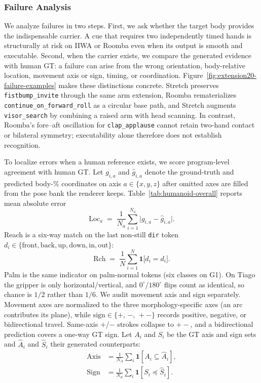 \documentclass[letterpaper,10pt,conference]{ieeeconf}
\begin{document}
\subsubsection{Failure Analysis}
We analyze failures in two steps. First, we ask whether the target body provides the indispensable carrier. A cue that requires two independently timed hands is structurally at risk on IIWA or Roomba even when its output is smooth and executable. Second, when the carrier exists, we compare the generated evidence with human GT: a failure can arise from the wrong orientation, body-relative location, movement axis or sign, timing, or coordination. Figure~\ref{fig:extension20-failure-examples} makes these distinctions concrete. Stretch preserves \texttt{fistbump\_invite} through the same arm extension, Roomba rematerializes \texttt{continue\_on\_forward\_roll} as a circular base path, and Stretch augments \texttt{visor\_search} by combining a raised arm with head scanning. In contrast, Roomba's fore--aft oscillation for \texttt{clap\_applause} cannot retain two-hand contact or bilateral symmetry; executability alone therefore does not establish recognition.

To localize errors when a human reference exists, we score program-level agreement with human GT.
Let $g_{i,a}$ and $\hat{g}_{i,a}$ denote the ground-truth and predicted body-\% coordinates on axis $a\in\{x,y,z\}$ after omitted axes are filled from the pose bank the renderer keeps.
Table~\ref{tab:humanoid-overall} reports mean absolute error
\begin{equation}
\mathrm{Loc}_a \;=\; \frac{1}{N_a}\sum_{i=1}^{N_a}\bigl|g_{i,a}-\hat{g}_{i,a}\bigr|.
\end{equation}
Reach is a six-way match on the last non-still \texttt{dir} token $d_i\in\{\mathrm{front},\mathrm{back},\mathrm{up},\mathrm{down},\mathrm{in},\mathrm{out}\}$:
\begin{equation}
\mathrm{Rch} \;=\; \frac{1}{N}\sum_{i=1}^{N}\mathbf{1}\bigl[\hat{d}_i=d_i\bigr].
\end{equation}
Palm is the same indicator on palm-normal tokens (six classes on G1).
On Tiago the gripper is only horizontal/vertical, and $0^\circ$/$180^\circ$ flips count as identical, so chance is $1/2$ rather than $1/6$.
We audit movement axis and sign separately. Movement axes are normalized to the three morphology-specific axes (an arc contributes its plane), while $\mathrm{sign}\in\{+,\,-,\,{+}{-}\}$ records positive, negative, or bidirectional travel. Same-axis $+$/$-$ strokes collapse to ${+}{-}$, and a bidirectional prediction covers a one-way GT sign. Let $A_i$ and $S_i$ be the GT axis and sign sets and $\hat{A}_i$ and $\hat{S}_i$ their generated counterparts:
\begin{equation}
\begin{aligned}
\mathrm{Axis} &= \frac{1}{N_A}\sum_i\mathbf{1}[A_i\subseteq\hat{A}_i],\\
\mathrm{Sign} &= \frac{1}{N_S}\sum_i\mathbf{1}[S_i\preceq\hat{S}_i].
\end{aligned}
\end{equation}
\end{document}
